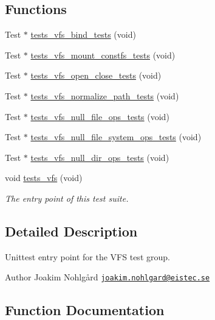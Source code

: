 \subsection*{Functions}
\textbf{ }\par
\begin{DoxyCompactItemize}
\item 
Test $\ast$ \hyperlink{tests-vfs_8c_a93aa0948d1133fbb161d95ab38a0a19f}{tests\+\_\+vfs\+\_\+bind\+\_\+tests} (void)
\item 
Test $\ast$ \hyperlink{tests-vfs_8c_a15914761731ece3546c1f4ae3b262c58}{tests\+\_\+vfs\+\_\+mount\+\_\+constfs\+\_\+tests} (void)
\item 
Test $\ast$ \hyperlink{tests-vfs_8c_a1431c12e4a6d8b993b1c7ca0c93f9b26}{tests\+\_\+vfs\+\_\+open\+\_\+close\+\_\+tests} (void)
\item 
Test $\ast$ \hyperlink{tests-vfs_8c_abe821476b768ed80152215152e320355}{tests\+\_\+vfs\+\_\+normalize\+\_\+path\+\_\+tests} (void)
\item 
Test $\ast$ \hyperlink{tests-vfs_8c_aa3c93ba92be080dce73d6ef5688ffb8b}{tests\+\_\+vfs\+\_\+null\+\_\+file\+\_\+ops\+\_\+tests} (void)
\item 
Test $\ast$ \hyperlink{tests-vfs_8c_af7fa3a64422e93a058748b6bd2516ae3}{tests\+\_\+vfs\+\_\+null\+\_\+file\+\_\+system\+\_\+ops\+\_\+tests} (void)
\item 
Test $\ast$ \hyperlink{tests-vfs_8c_a5e6248f295aefb41b6a0888f647e8fd9}{tests\+\_\+vfs\+\_\+null\+\_\+dir\+\_\+ops\+\_\+tests} (void)
\item 
void \hyperlink{group__unittests_gad7fb89debf7b41f1a3a0d7d988f7654c}{tests\+\_\+vfs} (void)
\begin{DoxyCompactList}\small\item\em The entry point of this test suite. \end{DoxyCompactList}\end{DoxyCompactItemize}



\subsection{Detailed Description}
Unittest entry point for the V\+FS test group. 

\begin{DoxyAuthor}{Author}
Joakim Nohlgård \href{mailto:joakim.nohlgard@eistec.se}{\tt joakim.\+nohlgard@eistec.\+se} 
\end{DoxyAuthor}


\subsection{Function Documentation}
\mbox{\label{tests-vfs_8c_a93aa0948d1133fbb161d95ab38a0a19f}} 
